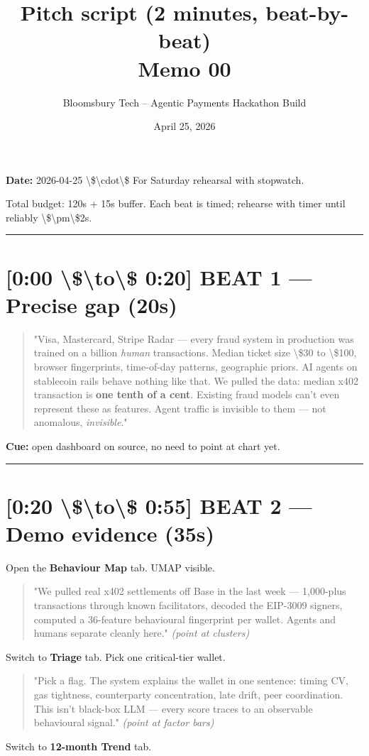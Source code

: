 \documentclass[11pt]{article}
\title{\textbf{Pitch script (2 minutes, beat-by-beat)}\\
\large Memo 00}
\author{Bloomsbury Tech -- Agentic Payments Hackathon Build}
\date{April 25, 2026}
\begin{document}
\maketitle

\textbf{Date:} 2026-04-25 \textbackslash{}\$\textbackslash{}cdot\textbackslash{}\$ For Saturday rehearsal with stopwatch.

Total budget: 120s + 15s buffer. Each beat is timed; rehearse with timer until reliably \textbackslash{}\$\textbackslash{}pm\textbackslash{}\$2s.

\medskip\hrule\medskip
\section{[0:00 \textbackslash{}\$\textbackslash{}to\textbackslash{}\$ 0:20] BEAT 1 --- Precise gap (20s)}
\begin{quote}
"Visa, Mastercard, Stripe Radar --- every fraud system in production was trained on a billion \emph{human} transactions. Median ticket size \textbackslash{}\$30 to \textbackslash{}\$100, browser fingerprints, time-of-day patterns, geographic priors.  AI agents on stablecoin rails behave nothing like that. We pulled the data: median x402 transaction is \textbf{one tenth of a cent}. Existing fraud models can't even represent these as features. Agent traffic is invisible to them --- not anomalous, \emph{invisible}."
\end{quote}
\textbf{Cue:} open dashboard on  source, no need to point at chart yet.

\medskip\hrule\medskip
\section{[0:20 \textbackslash{}\$\textbackslash{}to\textbackslash{}\$ 0:55] BEAT 2 --- Demo evidence (35s)}
Open the \textbf{Behaviour Map} tab. UMAP visible.

\begin{quote}
"We pulled real x402 settlements off Base in the last week --- 1,000-plus transactions through known facilitators, decoded the EIP-3009 signers, computed a 36-feature behavioural fingerprint per wallet. Agents and humans separate cleanly here." \emph{(point at clusters)}
\end{quote}
Switch to \textbf{Triage} tab. Pick one critical-tier wallet.

\begin{quote}
"Pick a flag. The system explains the wallet in one sentence: timing CV, gas tightness, counterparty concentration, late drift, peer coordination. This isn't black-box LLM --- every score traces to an observable behavioural signal." \emph{(point at factor bars)}
\end{quote}
Switch to \textbf{12-month Trend} tab.
\end{document}
